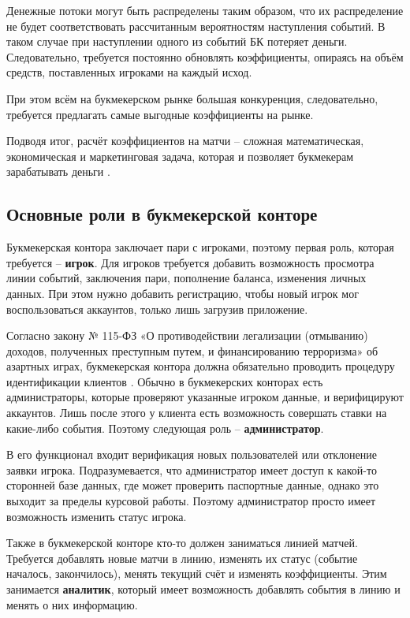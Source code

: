 Денежные потоки могут быть распределены таким образом, что их распределение не будет соответствовать рассчитанным вероятностям наступления событий. 
В таком случае при наступлении одного из событий БК потеряет деньги.
Следовательно, требуется постоянно обновлять коэффициенты, опираясь на объём средств, поставленных игроками на каждый исход.

При этом всём на букмекерском рынке большая конкуренция, следовательно, требуется предлагать самые выгодные коэффициенты на рынке.

Подводя итог, расчёт коэффициентов на матчи -- сложная математическая, экономическая и маркетинговая задача, которая и позволяет букмекерам зарабатывать деньги \cite{kfs}.

\subsection{Основные роли в букмекерской конторе}
Букмекерская контора заключает пари с игроками, поэтому первая роль, которая требуется -- \textbf{игрок}. 
Для игроков требуется добавить возможность просмотра линии событий, заключения пари, пополнение баланса, изменения личных данных.
При этом нужно добавить регистрацию, чтобы новый игрок мог воспользоваться аккаунтов, только лишь загрузив приложение. 

Согласно закону № 115-ФЗ «О противодействии легализации (отмыванию) доходов, полученных преступным путем, и финансированию терроризма» об азартных играх, букмекерская контора должна обязательно проводить процедуру идентификации клиентов \cite{bk2}. 
Обычно в букмекерских конторах есть администраторы, которые проверяют указанные игроком данные, и верифицируют аккаунтов. 
Лишь после этого у клиента есть возможность совершать ставки на какие-либо события.
Поэтому следующая роль -- \textbf{администратор}.

В его функционал входит верификация новых пользователей или отклонение заявки игрока.
Подразумевается, что администратор имеет доступ к какой-то сторонней базе данных, где может проверить паспортные данные, однако это выходит за пределы курсовой работы.
Поэтому администратор просто имеет возможность изменить статус игрока.

Также в букмекерской конторе кто-то должен заниматься линией матчей. 
Требуется добавлять новые матчи в линию, изменять их статус (событие началось, закончилось), менять текущий счёт и изменять коэффициенты.
Этим занимается \textbf{аналитик}, который имеет возможность добавлять события в линию и менять о них информацию.

